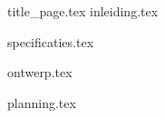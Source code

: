 \documentclass[final]{scrreprt}
\date{22 november 2013}
\begin{document}

{title_page.tex}
{inleiding.tex}
\newpage

\tableofcontents

\newpage
{}

{specificaties.tex}

{ontwerp.tex}

{planning.tex}



\newpage
{}

\printbibliography
\end{document}
